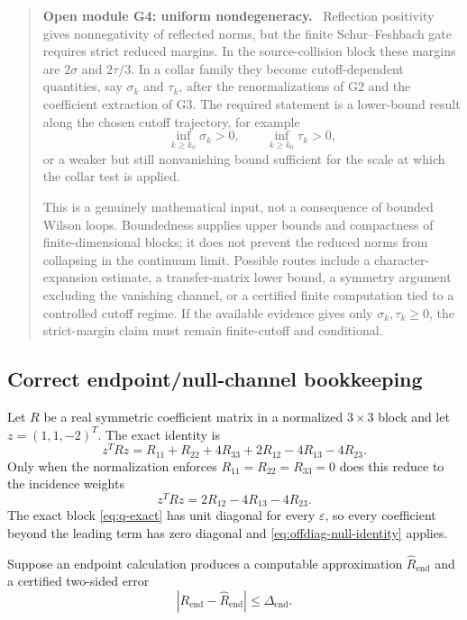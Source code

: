 \documentclass[11pt]{article}
\newcommand{\eps}{\varepsilon}
\newenvironment{openmodule}[1]
{\begin{quote}\color{red!55!black}\textbf{Open module #1.}\ }
{\end{quote}}
\begin{document}
\begin{openmodule}{G4: uniform nondegeneracy}
Reflection positivity gives nonnegativity of reflected norms, but the finite Schur--Feshbach gate requires strict reduced margins.  In the source-collision block these margins are \(2\sigma\) and \(2\tau/3\).  In a collar family they become cutoff-dependent quantities, say \(\sigma_k\) and \(\tau_k\), after the renormalizations of G2 and the coefficient extraction of G3.  The required statement is a lower-bound result along the chosen cutoff trajectory, for example
\[
  \inf_{k\ge k_0}\sigma_k>0,
  \qquad
  \inf_{k\ge k_0}\tau_k>0,
\]
or a weaker but still nonvanishing bound sufficient for the scale at which the collar test is applied.

This is a genuinely mathematical input, not a consequence of bounded Wilson loops.  Boundedness supplies upper bounds and compactness of finite-dimensional blocks; it does not prevent the reduced norms from collapsing in the continuum limit.  Possible routes include a character-expansion estimate, a transfer-matrix lower bound, a symmetry argument excluding the vanishing channel, or a certified finite computation tied to a controlled cutoff regime.  If the available evidence gives only \(\sigma_k,\tau_k\ge0\), the strict-margin claim must remain finite-cutoff and conditional.
\end{openmodule}

\subsection{Correct endpoint/null-channel bookkeeping}

Let $R$ be a real symmetric coefficient matrix in a normalized $3\times3$ block and let $z=(1,1,-2)^T$.  The exact identity is
\begin{equation}
  z^TRz
  =R_{11}+R_{22}+4R_{33}
  +2R_{12}-4R_{13}-4R_{23}.
  \label{eq:full-null-identity}
\end{equation}
Only when the normalization enforces $R_{11}=R_{22}=R_{33}=0$ does this reduce to the incidence weights
\begin{equation}
  z^TRz=2R_{12}-4R_{13}-4R_{23}.
  \label{eq:offdiag-null-identity}
\end{equation}
The exact block \eqref{eq:q-exact} has unit diagonal for every $\eps$, so every coefficient beyond the leading term has zero diagonal and \eqref{eq:offdiag-null-identity} applies.

Suppose an endpoint calculation produces a computable approximation $\widehat R_{\mathrm{end}}$ and a certified two-sided error
\begin{equation}
  |R_{\mathrm{end}}-\widehat R_{\mathrm{end}}|\le\Delta_{\mathrm{end}}.
  \label{eq:two-sided-endpoint-error}
\end{equation}
\end{document}
